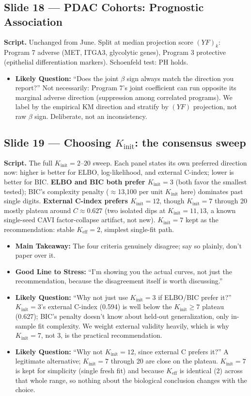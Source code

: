 \documentclass[11pt]{article}
\newcommand{\scriptlabel}{\textbf{Script. }}
\newcommand{\sectionlabel}[1]{\textbf{#1}}
\newcommand{\key}[1]{\textcolor{keyblue}{\textbf{#1}}}        %
\begin{document}
\subsection*{Slide 18 --- PDAC Cohorts: Prognostic Association}
\scriptlabel Unchanged from June. Split at median projection score $(YF)_k$: Program 7 adverse (MET,
ITGA3, glycolytic genes), Program 3 protective (epithelial differentiation markers). Schoenfeld test:
PH holds.

\begin{itemize}
\item \sectionlabel{Likely Question:} ``Does the joint $\beta$ sign always match the direction you
report?'' Not necessarily: Program 7's joint coefficient can run opposite its marginal adverse
direction (suppression among correlated programs). We label by the empirical KM direction and
stratify by $(YF)$ projection, not raw $\beta$ sign. Deliberate, not an inconsistency.
\end{itemize}

\subsection*{Slide 19 --- Choosing $K_\text{init}$: the consensus sweep}
\scriptlabel The full $K_\text{init}=2$--$20$ sweep. Each panel states its own preferred direction
now: higher is better for ELBO, log-likelihood, and external C-index; lower is better for BIC.
\key{ELBO and BIC both prefer $K_\text{init}=3$} (both favor the smallest tested); BIC's complexity
penalty ($\approx$13{,}100 per unit $K_\text{init}$ here) dominates past single digits. \key{External
C-index prefers $K_\text{init}=12$}, though $K_\text{init}=7$ through 20 mostly plateau around
$C\approx0.627$ (two isolated dips at $K_\text{init}=11,13$, a known single-seed CAVI factor-collapse
artifact, not new). $K_\text{init}=7$ kept as the recommendation: stable $K_\text{eff}=2$, simplest
single-fit path.

\begin{itemize}
\item \sectionlabel{Main Takeaway:} The four criteria genuinely disagree; say so plainly, don't paper
over it.
\item \sectionlabel{Good Line to Stress:} ``I'm showing you the actual curves, not just the
recommendation, because the disagreement itself is worth discussing.''
\item \sectionlabel{Likely Question:} ``Why not just use $K_\text{init}=3$ if ELBO/BIC prefer it?''
$K_\text{init}=3$'s external C-index (0.594) is well below the $K_\text{init}\ge7$ plateau (0.627);
BIC's penalty doesn't know about held-out generalization, only in-sample fit complexity. We weight
external validity heavily, which is why $K_\text{init}=7$, not 3, is the practical recommendation.
\item \sectionlabel{Likely Question:} ``Why not $K_\text{init}=12$, since external C prefers it?''
A legitimate alternative; $K_\text{init}=7$ through 20 are close on the plateau. $K_\text{init}=7$ is
kept for simplicity (single fresh fit) and because $K_\text{eff}$ is identical (2) across that whole
range, so nothing about the biological conclusion changes with the choice.
\end{itemize}
\end{document}
